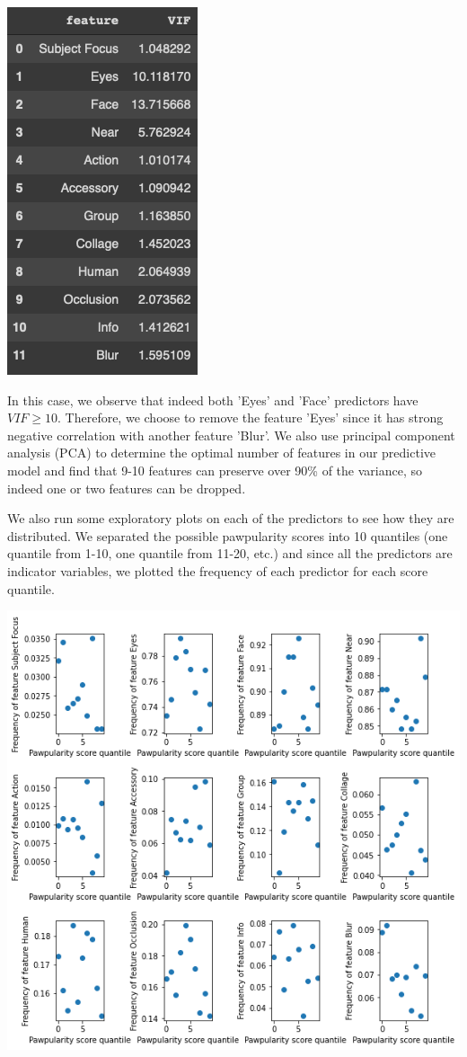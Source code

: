 \documentclass[12pt]{article}
\begin{document}
\includegraphics[scale=0.4]{7_VIF}

In this case, we observe that indeed both 'Eyes' and 'Face' predictors have $VIF\geq 10$. Therefore, we choose to remove the feature 'Eyes' since it has strong negative correlation with another feature 'Blur'. We also use principal component analysis (PCA) to determine the optimal number of features in our predictive model and find that 9-10 features can preserve over 90\% of the variance, so indeed one or two features can be dropped.\newline

We also run some exploratory plots on each of the predictors to see how they are distributed. We separated the possible pawpularity scores into 10 quantiles (one quantile from 1-10, one quantile from 11-20, etc.) and since all the predictors are indicator variables, we plotted the frequency of each predictor for each score quantile.\newline

\includegraphics[scale=0.4]{3_predictorsvquantile}
\end{document}
